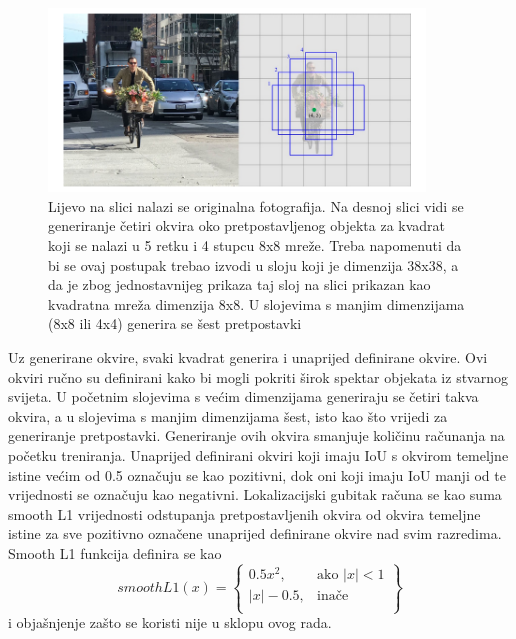 \begin{figure}[htb]
    \centering
    \includegraphics[width=10cm]{img/SSD-okviri.png}
    \caption{Lijevo na slici nalazi se originalna fotografija. Na desnoj slici vidi se generiranje četiri okvira oko pretpostavljenog objekta za kvadrat koji se 
    nalazi u 5 retku i 4 stupcu 8x8 mreže. Treba napomenuti da bi se ovaj postupak trebao izvodi u sloju koji je dimenzija 38x38, a da je zbog jednostavnijeg prikaza 
    taj sloj na slici prikazan kao kvadratna mreža dimenzija 8x8. U slojevima s manjim dimenzijama (8x8 ili 4x4) generira se šest pretpostavki}
    \label{SSD okvir}
\end{figure}

Uz generirane okvire, svaki kvadrat generira i unaprijed definirane okvire. Ovi okviri ručno su definirani kako bi mogli pokriti širok spektar objekata iz stvarnog svijeta.
U početnim slojevima s većim dimenzijama generiraju se četiri takva okvira, a u slojevima s manjim dimenzijama šest, isto kao što vrijedi za generiranje pretpostavki.
Generiranje ovih okvira smanjuje količinu računanja na početku treniranja.
Unaprijed definirani okviri koji imaju IoU s okvirom temeljne istine većim od 0.5 označuju se kao pozitivni, dok oni koji imaju IoU manji od te vrijednosti se označuju kao negativni.
Lokalizacijski gubitak računa se kao suma smooth L1 vrijednosti odstupanja pretpostavljenih okvira od okvira temeljne istine za sve pozitivno označene unaprijed definirane okvire nad svim razredima. 
Smooth L1 funkcija definira se kao 
\[
    smoothL1(x) = \left\{\begin{array}{lr}
        0.5x^2, & \text{ako } |x| <  1\\
        |x|- 0.5, & \text{inače } \\
        \end{array}\right\}
\]
i objašnjenje zašto se koristi nije u sklopu ovog rada. \citep{DBLP:journals/corr/LiuAESR15}
